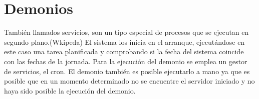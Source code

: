 \section{Demonios}
También llamados servicios, son un tipo especial de procesos que se ejecutan en segundo plano.(Wkipeda)
El sistema los inicia en el arranque, ejecutándose en este caso una tarea planificada y comprobando si la fecha del sistema coincide con las fechas de la jornada. Para la ejecución del demonio se emplea un gestor de servicios, el cron. El demonio también es posible ejecutarlo a mano ya que es posible que en un momento determinado no se encuentre el servidor iniciado y no haya sido posible la ejecución del demonio.